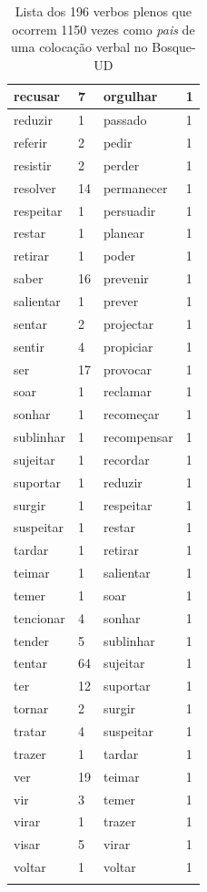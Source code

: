 \documentclass[output=paper,colorlinks,citecolor=brown]{langscibook}
\begin{document}
\begin{longtable}{ p{3cm} | p{1cm} | p{3cm} | p{1cm} }
			recusar & 7 & orgulhar & 1\\\hline
			reduzir & 1 & passado & 1\\\hline
			referir & 2 & pedir & 1\\\hline
			resistir & 2 & perder & 1\\\hline
			resolver & 14 & permanecer & 1\\\hline
			respeitar & 1 & persuadir & 1\\\hline
			restar & 1 & planear & 1\\\hline
			retirar & 1 & poder & 1\\\hline
			saber & 16 & prevenir & 1\\\hline
			salientar & 1 & prever & 1\\\hline
			sentar & 2 & projectar & 1\\\hline
			sentir & 4 & propiciar & 1\\\hline
			ser & 17 & provocar & 1\\\hline
			soar & 1 & reclamar & 1\\\hline
			sonhar & 1 & recomeçar & 1\\\hline
			sublinhar & 1 & recompensar & 1\\\hline
			sujeitar & 1 & recordar & 1\\\hline
			suportar & 1 & reduzir & 1\\\hline
			surgir & 1 & respeitar & 1\\\hline
			suspeitar & 1 & restar & 1\\\hline
			tardar & 1 & retirar & 1\\\hline
			teimar & 1 & salientar & 1\\\hline
			temer & 1 & soar & 1\\\hline
			tencionar & 4 & sonhar & 1\\\hline
			tender & 5 & sublinhar & 1\\\hline
			tentar & 64 & sujeitar & 1\\\hline
			ter & 12 & suportar & 1\\\hline
			tornar & 2 & surgir & 1\\\hline
			tratar & 4 & suspeitar & 1\\\hline
			trazer & 1 & tardar & 1\\\hline
			ver & 19 & teimar & 1\\\hline
			vir & 3 & temer & 1\\\hline
			virar & 1 & trazer & 1\\\hline
			visar & 5 & virar & 1\\\hline
			voltar & 1 & voltar & 1\\\hline
			\caption{Lista dos 196 verbos plenos que ocorrem 1150 vezes como \emph{pais} de uma colocação verbal no Bosque-UD}
			\label{tab:nãolocverbal}
		\end{longtable}
\end{document}
